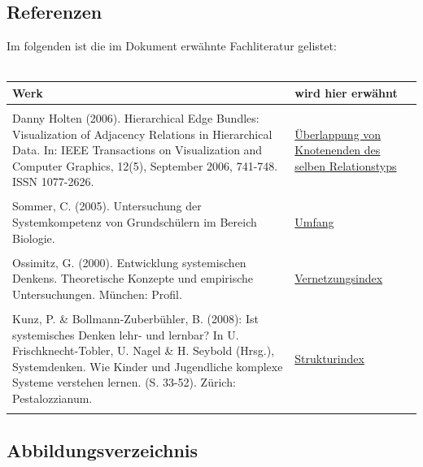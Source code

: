 \documentclass[enabledeprecatedfontcommands,fontsize=11pt,paper=a4,twoside]{scrartcl}
\begin{document}
\subsection{Referenzen} 
Im folgenden ist die im Dokument erwähnte Fachliteratur gelistet: \\ \\
\begin{tabular}{p{11cm}p{5cm}}
	Werk & wird hier erwähnt \\ \hline \\
	Danny Holten (2006). Hierarchical Edge Bundles: Visualization of Adjacency Relations in Hierarchical Data. In: IEEE Transactions on Visualization and Computer Graphics, 12(5), September 2006, 741-748. ISSN 1077-2626. & \hyperlink{cc}{Überlappung von Knotenenden des selben Relationstyps} \\ \\ 
	Sommer, C. (2005). Untersuchung der Systemkompetenz von Grundschülern im Bereich Biologie.& \hyperlink{Umfang}{Umfang} \\ \\
	Ossimitz, G. (2000). Entwicklung systemischen Denkens. Theoretische Konzepte und empirische Untersuchungen. München: Profil. & \hyperlink{Vernetzungsindex}{Vernetzungsindex} \\ \\
	Kunz, P. \& Bollmann-Zuberbühler, B. (2008): Ist systemisches Denken lehr- und lernbar? In U. Frischknecht-Tobler, U. Nagel \& H. Seybold (Hrsg.), Systemdenken. Wie Kinder und Jugendliche komplexe Systeme verstehen lernen. (S. 33-52). Zürich: Pestalozzianum. & \hyperlink{Strukturindex}{Strukturindex} \\ \\
\end{tabular}


\newpage

\subsection{Abbildungsverzeichnis}
\listoffigures
\end{document}
